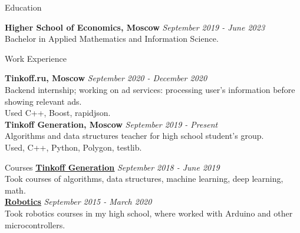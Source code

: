 \documentclass{resume} %
\begin{document}
\begin{rSection}{Education}

{\bf Higher School of Economics, Moscow} \hfill {\em September 2019 - June 2023} \\ 
Bachelor in Applied Mathematics and Information Science.

\end{rSection}

\begin{rSection}{Work Experience}

{\bf Tinkoff.ru, Moscow} \hfill {\em September 2020 - December 2020} \\ Backend internship; working on ad services: processing user's information before showing relevant ads. \\ Used C++, Boost, rapidjson. \\
{\bf Tinkoff Generation, Moscow} \hfill {\em September 2019 - Present} \\ Algorithms and data structures teacher for high school student's group. \\ Used, C++, Python, Polygon, testlib.
\end{rSection}

\begin{rSection}{Courses}
{\bf \href{http://github.com/kik0s/tink}{\underline{Tinkoff Generation}}} \hfill {\em September 2018 - June 2019} \\
Took courses of algorithms, data structures, machine learning, deep learning, math. \\
{\bf \href{http://github.com/it-church/rbtrf-2018}{\underline{Robotics}}} \hfill {\em September 2015 - March 2020} \\
Took robotics courses in my high school, where worked with Arduino and other microcontrollers. \\
\end{rSection}
\end{document}
